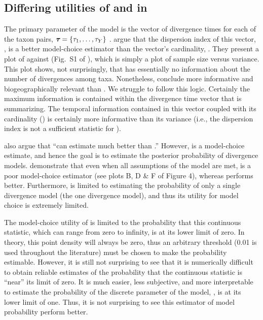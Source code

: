 \documentclass[letterpaper,12pt]{article}
\begin{document}
\begin{linenumbers}
\section*{Differing utilities of \numt{} and \vmratio{} in \msb}
The primary parameter of the \msb model is the vector of divergence
times for each of the taxon pairs,
$\boldsymbol{\tau_{}} = \{\tau_{1}, \ldots, \tau_{Y}\}$
\citep{Oaks2012}.
\citet{Hickerson2013} argue that the dispersion index of this vector,
\vmratio{}, is a better model-choice estimator than the vector's cardinality,
\numt{}.
They present a plot of \numt{} against \vmratio{} (Fig.~S1 of
\citet{Hickerson2013}), which is simply a plot of sample size versus variance.
This plot shows, not surprisingly, that \vmratio{} has essentially no
information about the number of divergences among taxa.
Nonetheless, \citet{Hickerson2013} conclude \vmratio{} more informative and
biogeographically relevant than \numt{}.
We struggle to follow this logic.
Certainly the maximum information is contained within the divergence time
vector that \vmratio{} is summarizing.
The temporal information contained in this vector coupled with its cardinality
(\numt{}) is certainly more informative than its variance (i.e., the dispersion
index is not a sufficient statistic for \divtvector).

\citet{Hickerson2013} also argue that ``\msb can estimate \vmratio{} much
better than \numt{}.''
However, \msb is a model-choice estimate, and hence the goal is to estimate the
posterior probability of divergence models.
\citet{Oaks2012} demonstrate that even when all assumptions of the model are
met, \vmratio is a poor model-choice estimator (see plots B, D \& F of Figure
4), whereas \numt{} performs better.
Furthermore, \vmratio{} is limited to estimating the probability of only a
single divergence model (the one divergence model), and thus its utility for
model choice is extremely limited.

The model-choice utility of \vmratio{} is limited to the probability that
this continuous statistic, which can range from zero to infinity, is at its lower
limit of zero. In theory, this point density will always be zero, thus an
arbitrary threshold (0.01 is used throughout the \msb literature) must 
be chosen to make the probability estimable.
However, it is still not surprising to see that it is numerically difficult to
obtain reliable estimates of the probability that the continuous \vmratio{}
statistic is ``near'' its limit of zero.
It is much easier, less subjective, and more interpretable to estimate
the probability of the discrete parameter of the model, \numt{}, is
at its lower limit of one.
Thus, it is not surprising to see this estimator of model probability
perform better.



\end{linenumbers}
\end{document}
